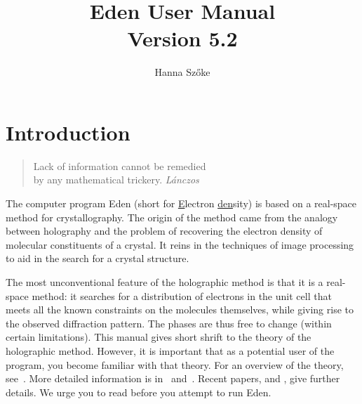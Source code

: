 \documentclass{report}
\begin{document}
\title{{ Eden User Manual} \\ Version 5.2}
\author {Hanna Sz\H{o}ke}

\maketitle

\parindent=0pt 
\baselineskip=18pt 
\lineskip=0pt

\tableofcontents

\pagestyle{headings}

\def\delfo{$\delta_{fo}$~}
\def\delfc{$\delta_{fc}$~}
\def\qq{\qquad\qquad}
\def\hbar{\overline{h}}



\chapter{Introduction} 
\label{intro}

\begin{quote}
\raggedleft Lack of information cannot be remedied \\
by any mathematical trickery. {\em L\'anczos}\cite{lanczos}
\end{quote}

\vspace {0.1in}

The computer program Eden (short for \underline{E}lectron \underline{den}sity)
is based on a real-space method for crystallography.  The origin of the 
method came from the analogy between holography and the problem of 
recovering the electron density of molecular constituents of a crystal.
It reins in the techniques of image processing to aid in the search for a 
crystal structure.

\vspace {0.1in}

The most unconventional feature of the holographic method is that it is
a real-space method: it searches for a distribution of electrons in the unit
cell that meets all the known constraints on the molecules themselves, while
giving rise to the observed diffraction pattern.  The phases are thus free
to change (within certain limitations).
This manual gives short shrift to the theory of the holographic method.  
However, it is important that as a 
potential user of the program, you become familiar with that theory.  
For an overview of the theory, see~\cite{edenwww}.  More detailed 
information is in \cite{eden2}~and~\cite{eden4}.  
Recent papers, \cite{eden5} and \cite{eden6}, give further details.  
We urge you to read \cite{edenwww} before you attempt to run Eden.
\end{document}
